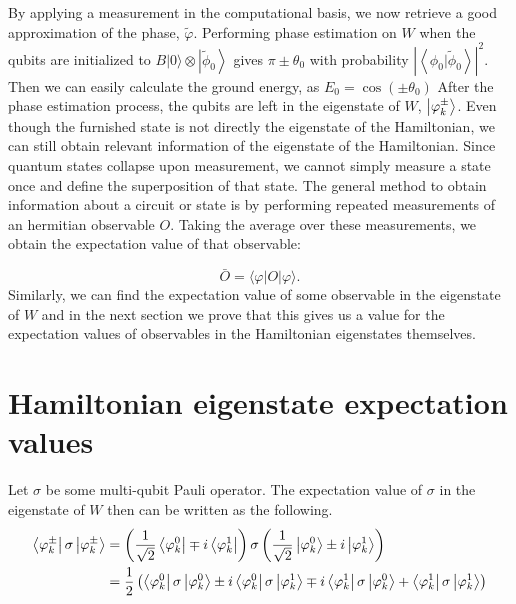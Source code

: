 By applying a measurement in the computational basis, we now retrieve a good approximation of the phase, $\tilde{\varphi}$. Performing phase estimation on $W$ when the qubits are initialized to \(B|0\rangle \otimes\left|\tilde{\phi}_{0}\right\rangle\) gives $\pi \pm \theta_0$ with probability \(\left|\left\langle\phi_{0} | \tilde{\phi}_{0}\right\rangle\right|^{2}\). Then we can easily calculate the ground energy, as \(E_{0}=\cos \left(\pm \theta_{0}\right)\)
After the phase estimation process, the qubits are left in the eigenstate of $W$, $\left\vert{\varphi^{\pm}_k}\right\rangle$. Even though the furnished state is not directly the eigenstate of the Hamiltonian, we can still obtain relevant information of the eigenstate of the Hamiltonian. Since quantum states collapse upon measurement, we cannot simply measure a state once and define the superposition of that state. The general method to obtain information about a circuit or state is by performing repeated measurements of an hermitian observable $O$. Taking the average over these measurements, we obtain the expectation value of that observable:

$$
\bar{O}=\langle\varphi|O| \varphi\rangle.
$$ Similarly, we can find the expectation value of some observable in the eigenstate of $W$ and in the next section we prove that this gives us a value for the expectation values of observables in the Hamiltonian eigenstates themselves.



\section{Hamiltonian eigenstate expectation values}
Let $\sigma$ be some multi-qubit Pauli operator. The expectation value of $\sigma$ in the eigenstate of $W$ then can be written as the following.
\begin{align} \begin{split}
\left\langle{\varphi_k^{\pm}}\right\vert \sigma \left\vert{\varphi_k^{\pm}}\right\rangle &= \left(\frac{1}{\sqrt{2}}\left\langle{\varphi_k^0}\right\vert \mp i \left\langle{\varphi_k^1}\right\vert\right) \sigma \left(\frac{1}{\sqrt{2}} \left\vert{\varphi_k^0}\right\rangle \pm i \left\vert{\varphi_k^1}\right\rangle \right)\\
&= \frac{1}{2}\left(\left\langle{\varphi_k^0}\right\vert \sigma \left\vert{\varphi_k^0}\right\rangle \pm i \left\langle{\varphi_k^0}\right\vert \sigma \left\vert{\varphi_k^1}\right\rangle \mp i \left\langle{\varphi_k^1}\right\vert \sigma \left\vert{\varphi_k^0}\right\rangle + \left\langle{\varphi_k^1}\right\vert \sigma \left\vert{\varphi_k^1}\right\rangle\right)\\
\end{split}\end{align}

